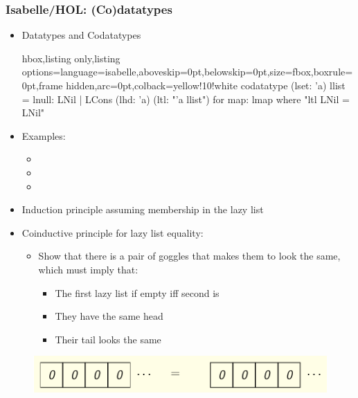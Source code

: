 \documentclass[aspectratio=169,10pt]{beamer}
\begin{document}
\begin{frame}
  \frametitle{Isabelle/HOL: (Co)datatypes}
  \begin{itemize}
    \item Datatypes and Codatatypes
\vspace*{-1ex}
          \begin{tcblisting}{hbox,listing only,listing options={language=isabelle,aboveskip=0pt,belowskip=0pt},size=fbox,boxrule=0pt,frame hidden,arc=0pt,colback=yellow!10!white}
codatatype (lset: 'a) llist = lnull: LNil | LCons (lhd: 'a) (ltl: "'a llist")
  for map: lmap where "ltl LNil = LNil"
          \end{tcblisting}
\vspace*{-1ex}
    \item Examples:
\vspace*{-1ex}
          \begin{itemize}
            \item {}
            \item {}
            \item {}
          \end{itemize}
    \item Induction principle assuming membership in the lazy list
    \item Coinductive principle for lazy list equality:
          \begin{itemize}
            \item Show that there is a pair of goggles that makes them to look the same, which must imply that:
                  \begin{itemize}
                    \item The first lazy list if empty iff second is
                    \item They have the same head
                    \item Their tail looks the same
                  \end{itemize}
          \end{itemize}
  \end{itemize}
\vspace*{-1ex}
  \begin{figure}
    \centering
    \includegraphics[scale=0.4]{equality.png}
  \end{figure}
\end{frame}
\end{document}
